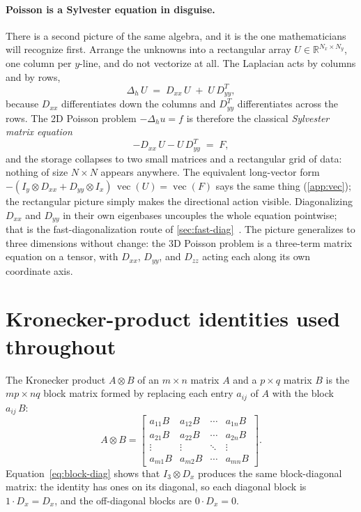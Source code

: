 \documentclass[11pt]{article}
\newcommand{\kron}{\otimes}
\newcommand{\Dx}{D_{x}}
\newcommand{\Dxx}{D_{xx}}
\newcommand{\Dyy}{D_{yy}}
\newcommand{\Dzz}{D_{zz}}
\newcommand{\Ix}{I_{x}}
\newcommand{\Iy}{I_{y}}
\newcommand{\R}{\mathbb{R}}
\newcommand{\vect}{\operatorname{vec}}
\newcommand{\Lap}{\Delta_h}
\newcommand{\Nall}{N}
\begin{document}
\paragraph{Poisson is a Sylvester equation in disguise.}
There is a second picture of the same algebra, and it is the one
mathematicians will recognize first.  Arrange the unknowns into a
rectangular array $U \in \R^{N_x \times N_y}$, one column per
$y$-line, and do not vectorize at all.  The Laplacian acts by
columns and by rows,
\begin{equation}
\label{eq:sylvester-view}
  \Lap\, U \;=\; \Dxx\, U \;+\; U\, \Dyy^T,
\end{equation}
because $\Dxx$ differentiates down the columns and $\Dyy^T$
differentiates across the rows.  The 2D Poisson problem
$-\Lap u = f$ is therefore the classical \emph{Sylvester matrix
equation}
\begin{equation}
\label{eq:sylvester}
  -\Dxx\, U - U\, \Dyy^T \;=\; F,
\end{equation}
and the storage collapses to two small matrices and a rectangular
grid of data: nothing of size $\Nall \times \Nall$ appears anywhere.
The equivalent long-vector form $-(\Iy \kron \Dxx + \Dyy \kron
\Ix)\,\vect(U) = \vect(F)$ says the same thing
(\cref{app:vec}); the rectangular picture simply makes the directional
action visible.  Diagonalizing $\Dxx$ and $\Dyy$ in their own
eigenbases uncouples the whole equation pointwise; that is the
fast-diagonalization route of
\cref{sec:fast-diag}~\citep{lynch1964direct}.  The picture
generalizes to three dimensions without change: the 3D Poisson
problem is a three-term matrix equation on a tensor, with $\Dxx$,
$\Dyy$, and $\Dzz$ acting each along its own coordinate axis.


\section{Kronecker-product identities used throughout}
\label{sec:kron}

The Kronecker product $A \kron B$ of an $m \times n$ matrix $A$ and a
$p \times q$ matrix $B$ is the $mp \times nq$ block matrix formed by
replacing each entry $a_{ij}$ of $A$ with the block $a_{ij}\,B$:
\begin{equation}
\label{eq:kron-def}
  A \kron B
  =
  \begin{bmatrix}
    a_{11} B & a_{12} B & \cdots & a_{1n} B \\
    a_{21} B & a_{22} B & \cdots & a_{2n} B \\
    \vdots   & \vdots   & \ddots & \vdots   \\
    a_{m1} B & a_{m2} B & \cdots & a_{mn} B
  \end{bmatrix}.
\end{equation}
Equation~\eqref{eq:block-diag} shows that $I_3 \kron \Dx$ produces the
same block-diagonal matrix: the identity has ones on its diagonal, so
each diagonal block is $1 \cdot \Dx = \Dx$, and the off-diagonal blocks
are $0 \cdot \Dx = 0$.
\end{document}

